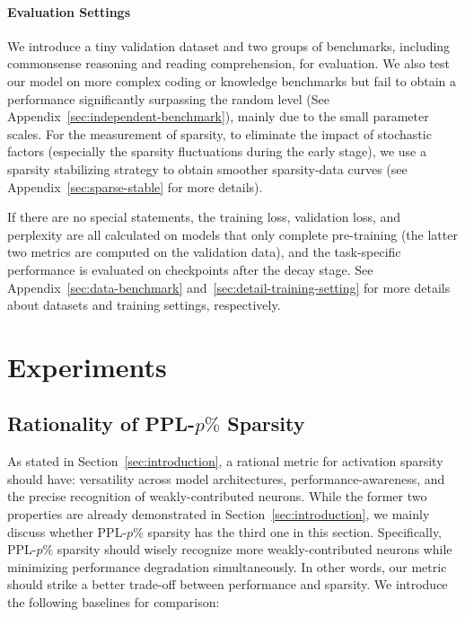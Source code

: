 \documentclass{article} %
\begin{document}

\paragraph{Evaluation Settings} We introduce a tiny validation dataset and two groups of benchmarks, including commonsense reasoning and reading comprehension, for evaluation. We also test our model on more complex coding or knowledge benchmarks but fail to obtain a performance significantly surpassing the random level (See Appendix~\ref{sec:independent-benchmark}), mainly due to the small parameter scales. For the measurement of sparsity, to eliminate the impact of stochastic factors (especially the sparsity fluctuations during the early stage), we use a sparsity stabilizing strategy to obtain smoother sparsity-data curves (see Appendix~\ref{sec:sparse-stable} for more details).

If there are no special statements, the training loss, validation loss, and perplexity are all calculated on models that only complete pre-training (the latter two metrics are computed on the validation data), and the task-specific performance is evaluated on checkpoints after the decay stage. See Appendix~\ref{sec:data-benchmark} and~\ref{sec:detail-training-setting} for more details about datasets and training settings, respectively.

\section{Experiments}

\subsection{Rationality of PPL-$p\%$ Sparsity} \label{sec:rationality-measure}

As stated in Section~\ref{sec:introduction}, a rational metric for activation sparsity should have: versatility across model architectures, performance-awareness, and the precise recognition of weakly-contributed neurons. While the former two properties are already demonstrated in Section~\ref{sec:introduction}, we mainly discuss whether PPL-$p\%$ sparsity has the third one in this section. Specifically, PPL-$p\%$ sparsity should wisely recognize more weakly-contributed neurons while minimizing performance degradation simultaneously. In other words, our metric should strike a better trade-off between performance and sparsity. We introduce the following baselines for comparison:
\end{document}

